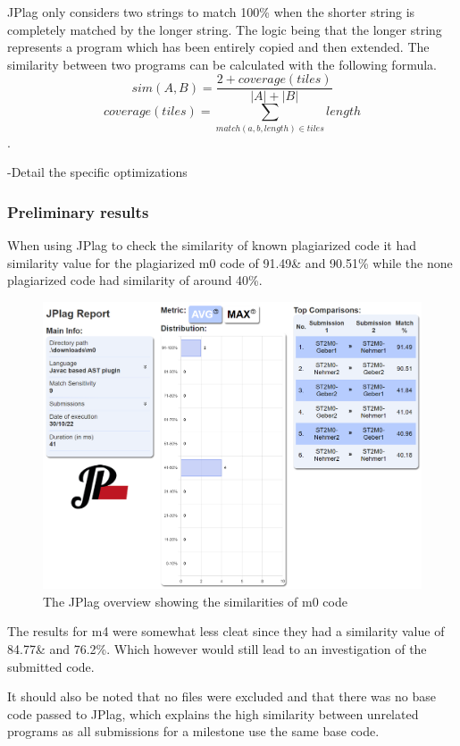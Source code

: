 \documentclass[a4paper, 11pt]{article}
\renewcommand{\\}{\vspace*{0.5\baselineskip} \newline}
\begin{document}
JPlag only considers two strings to match 100\% when the shorter string is completely matched by the longer string. The logic being that the longer string
represents a program which has been entirely copied and then extended. 
The similarity between two programs can be calculated with the following formula.
\[
	sim(A,B) = \frac{2+coverage(tiles)}{|A|+|B|}
\]
\[
	coverage(tiles) = \sum_{match(a,b,length)\in tiles} length
\]
\autocite[p. 13]{JPlagP}.

{\color{red} -Detail the specific optimizations}

\subsubsection{Preliminary results}

When using JPlag to check the similarity of known plagiarized code it had similarity value for the plagiarized m0 code of 91.49\& and 90.51\% while the
none plagiarized code had similarity of around 40\%.
\begin{figure}[h]
	\includegraphics[scale=0.4]{figs/JPlag/JPlag_Overview.png}
	\caption{The JPlag overview showing the similarities of m0 code}
\end{figure}
The results for m4 were somewhat less cleat since they had a similarity value of 84.77\& and 76.2\%. Which however would still lead to an investigation
of the submitted code.

It should also be noted that no files were excluded and that there was no base code passed to JPlag, which explains the high similarity between unrelated
programs as all submissions for a milestone use the same base code.
\end{document}
